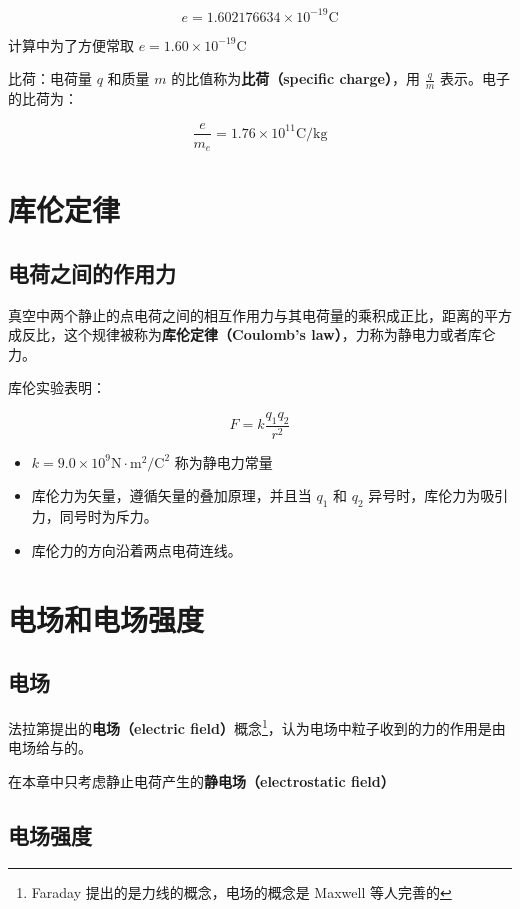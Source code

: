\documentclass[lang=cn,newtx,10pt,scheme=chinese]{elegantbook}
\begin{document}
$$
e = 1.602176634\times 10^{-19} \text{C}
$$

计算中为了方便常取 $\displaystyle e=1.60\times10^{-19}\text{C}$

比荷：电荷量 $q$ 和质量 $m$ 的比值称为\textbf{比荷（specific charge）}，用 $\displaystyle \frac{q}{m}$ 表示。电子的比荷为：

$$
\frac{e}{m_e} = 1.76\times 10^{11} \text{C/kg}
$$

\section{库伦定律}

\subsection{电荷之间的作用力}

真空中两个静止的点电荷之间的相互作用力与其电荷量的乘积成正比，距离的平方成反比，这个规律被称为\textbf{库伦定律（Coulomb's law）}，力称为静电力或者库仑力。

库伦实验表明：

$$
F = k\frac{q_1q_2}{r^2}
$$

\begin{itemize}
  \item $k=9.0 \times 10^9 \text{N} \cdot \text{m}^2 / \text{C}^2$ 称为静电力常量
  \item 库伦力为矢量，遵循矢量的叠加原理，并且当 $q_1$ 和 $q_2$ 异号时，库伦力为吸引力，同号时为斥力。
  \item 库伦力的方向沿着两点电荷连线。
\end{itemize}

\section{电场和电场强度}

\subsection{电场}

法拉第提出的\textbf{电场（electric field）}概念\footnote{Faraday 提出的是力线的概念，电场的概念是 Maxwell 等人完善的}，认为电场中粒子收到的力的作用是由电场给与的。

\begin{note}
  在本章中只考虑静止电荷产生的\textbf{静电场（electrostatic field）}
\end{note}

\subsection{电场强度}
\end{document}
